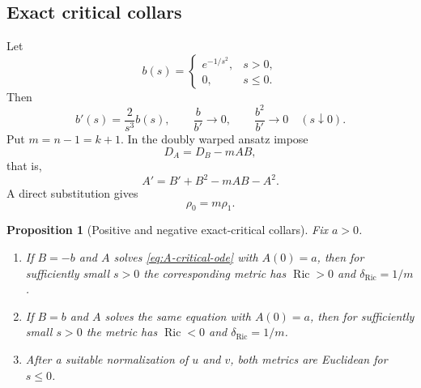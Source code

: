 \documentclass[11pt,reqno]{amsart}
\newtheorem{proposition}[theorem]{Proposition}
\theoremstyle{definition}
\theoremstyle{remark}
\newcommand{\Ric}{\operatorname{Ric}}
\newcommand{\dric}{\delta_{\mathrm{Ric}}}
\begin{document}
\subsection{Exact critical collars}

Let
\begin{equation}\label{eq:flat-b}
b(s)=\begin{cases}e^{-1/s^2},&s>0,\\0,&s\le0.\end{cases}
\end{equation}
Then
\begin{equation}\label{eq:b-dominates}
b'(s)=\frac2{s^3}b(s),
\qquad
\frac{b}{b'}\to0,
\qquad
\frac{b^2}{b'}\to0
\quad(s\downarrow0).
\end{equation}
Put $m=n-1=k+1$.  In the doubly warped ansatz impose
\begin{equation}\label{eq:critical-identity}
D_A=D_B-mAB,
\end{equation}
that is,
\begin{equation}\label{eq:A-critical-ode}
A'=B'+B^2-mAB-A^2.
\end{equation}
A direct substitution gives
\begin{equation}\label{eq:rho-critical-relation}
\rho_0=m\rho_1.
\end{equation}

\begin{proposition}[Positive and negative exact-critical collars]\label{prop:critical-collars}
Fix $a>0$.
\begin{enumerate}[label=(\roman*)]
\item If $B=-b$ and $A$ solves \eqref{eq:A-critical-ode} with $A(0)=a$, then for sufficiently small $s>0$ the corresponding metric has $\Ric>0$ and $\dric=1/m$.
\item If $B=b$ and $A$ solves the same equation with $A(0)=a$, then for sufficiently small $s>0$ the metric has $\Ric<0$ and $\dric=1/m$.
\item After a suitable normalization of $u$ and $v$, both metrics are Euclidean for $s\le0$.
\end{enumerate}
\end{proposition}
\end{document}
